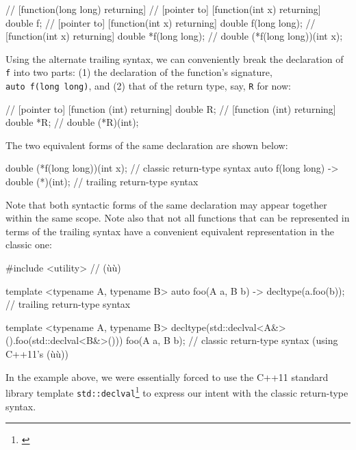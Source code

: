 \begin{emcppslisting}
// [function(long long) returning]
//     [pointer to] [function(int x) returning] double   f;
//     [pointer to] [function(int x) returning] double   f(long long);
//                  [function(int x) returning] double  *f(long long);
//                                              double (*f(long long))(int x);
\end{emcppslisting}

\noindent Using the alternate trailing syntax, we can conveniently break the
declaration of \lstinline!f! into two parts: (1) the declaration of the
function's signature, \lstinline!auto!~\lstinline!f(long!~\lstinline!long)!, and (2) that of the return type, say, \lstinline!R! for now:

\begin{emcppslisting}
// [pointer to] [function (int) returning] double   R;
//              [function (int) returning] double  *R;
//                                         double (*R)(int);
\end{emcppslisting}

\noindent The two equivalent forms of the same declaration are shown below:

\begin{emcppslisting}
double (*f(long long))(int x);         // classic return-type syntax
auto f(long long) -> double (*)(int);  // trailing return-type syntax
\end{emcppslisting}

\noindent Note that both syntactic forms of the same declaration may appear
together within the same scope. Note also that not all functions that
can be represented in terms of the trailing syntax have a convenient
equivalent representation in the classic one:

\begin{emcppslisting}
#include <utility>  // (ù{}ù)

template <typename A, typename B>
auto foo(A a, B b) -> decltype(a.foo(b));
    // trailing return-type syntax

template <typename A, typename B>
decltype(std::declval<A&>().foo(std::declval<B&>())) foo(A a, B b);
    // classic return-type syntax (using C++11's (ù{}ù))
\end{emcppslisting}

\noindent In the example above, we were essentially forced to use the C++11
standard library template \lstinline!std::declval!\footnote{\cite{cpprefdeclval}} to express our intent with the classic
return-type syntax.

